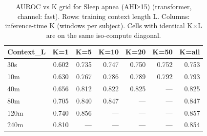 \begin{table}[ht]
\centering
\caption{AUROC vs K grid for Sleep apnea (AHI≥15) (transformer, channel: fast). Rows: training context length L. Columns: inference-time K (windows per subject). Cells with identical K×L are on the same iso-compute diagonal.}
\label{tab:kgrid_apnea_binary_transformer_fast}
\begin{tabular}{lrrrrrr}
\toprule
Context_L & K=1 & K=5 & K=10 & K=20 & K=50 & K=all \\
\midrule
30s & 0.602 & 0.735 & 0.747 & 0.750 & 0.752 & 0.753 \\
10m & 0.630 & 0.767 & 0.786 & 0.789 & 0.792 & 0.793 \\
40m & 0.656 & 0.812 & 0.822 & 0.825 & — & 0.825 \\
80m & 0.705 & 0.840 & 0.847 & — & — & 0.847 \\
120m & 0.740 & 0.856 & — & — & — & 0.857 \\
240m & 0.810 & — & — & — & — & 0.854 \\
\bottomrule
\end{tabular}
\end{table}